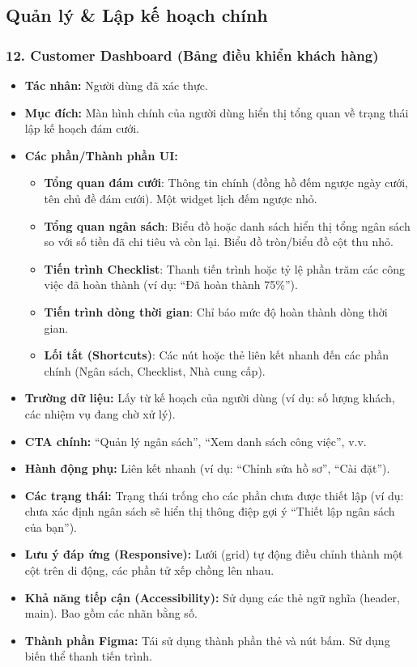 \documentclass[11pt,a4paper]{article}
\begin{document}
\subsection{Quản lý \& Lập kế hoạch chính}

\subsubsection{12. Customer Dashboard (Bảng điều khiển khách hàng)}
\begin{itemize}
    \item \textbf{Tác nhân:} Người dùng đã xác thực.
    \item \textbf{Mục đích:} Màn hình chính của người dùng hiển thị tổng quan về trạng thái lập kế hoạch đám cưới.
    \item \textbf{Các phần/Thành phần UI:}
    \begin{itemize}
        \item \textbf{Tổng quan đám cưới}: Thông tin chính (đồng hồ đếm ngược ngày cưới, tên chủ đề đám cưới). Một widget lịch đếm ngược nhỏ.
        \item \textbf{Tổng quan ngân sách}: Biểu đồ hoặc danh sách hiển thị tổng ngân sách so với số tiền đã chi tiêu và còn lại. Biểu đồ tròn/biểu đồ cột thu nhỏ.
        \item \textbf{Tiến trình Checklist}: Thanh tiến trình hoặc tỷ lệ phần trăm các công việc đã hoàn thành (ví dụ: ``Đã hoàn thành 75\%'').
        \item \textbf{Tiến trình dòng thời gian}: Chỉ báo mức độ hoàn thành dòng thời gian.
        \item \textbf{Lối tắt (Shortcuts)}: Các nút hoặc thẻ liên kết nhanh đến các phần chính (Ngân sách, Checklist, Nhà cung cấp).
    \end{itemize}
    \item \textbf{Trường dữ liệu:} Lấy từ kế hoạch của người dùng (ví dụ: số lượng khách, các nhiệm vụ đang chờ xử lý).
    \item \textbf{CTA chính:} ``Quản lý ngân sách'', ``Xem danh sách công việc'', v.v.
    \item \textbf{Hành động phụ:} Liên kết nhanh (ví dụ: ``Chỉnh sửa hồ sơ'', ``Cài đặt'').
    \item \textbf{Các trạng thái:} Trạng thái trống cho các phần chưa được thiết lập (ví dụ: chưa xác định ngân sách sẽ hiển thị thông điệp gợi ý ``Thiết lập ngân sách của bạn'').
    \item \textbf{Lưu ý đáp ứng (Responsive):} Lưới (grid) tự động điều chỉnh thành một cột trên di động, các phần tử xếp chồng lên nhau.
    \item \textbf{Khả năng tiếp cận (Accessibility):} Sử dụng các thẻ ngữ nghĩa (header, main). Bao gồm các nhãn bằng số.
    \item \textbf{Thành phần Figma:} Tái sử dụng thành phần thẻ và nút bấm. Sử dụng biến thể thanh tiến trình.
\end{itemize}
\end{document}

